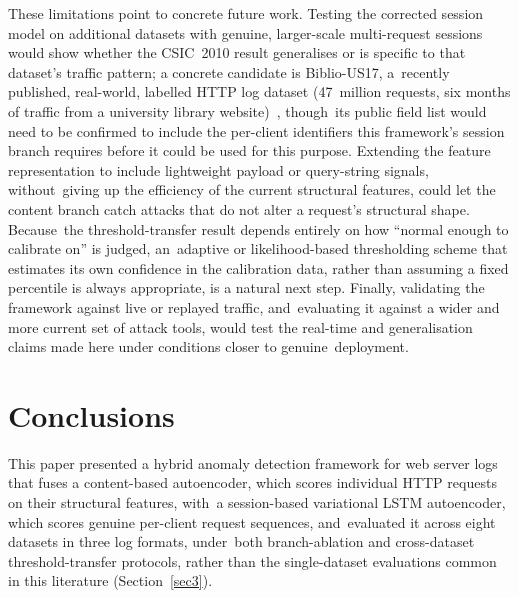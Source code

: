 \documentclass[futureinternet,article,accept,moreauthors]{Definitions/mdpi}
\begin{document}
These limitations point to concrete future work. Testing the corrected session model on additional datasets with genuine, larger-scale multi-request sessions would show whether the CSIC~2010 result generalises or is specific to that dataset's traffic pattern; a concrete candidate is Biblio-US17, a~recently published, real-world, labelled HTTP log dataset (\mbox{47 million} requests, six months of traffic from a university library website)~\cite{diazverdejo2025}, though~its public field list would need to be confirmed to include the per-client identifiers this framework's session branch requires before it could be used for this purpose. Extending the feature representation to include lightweight payload or query-string signals, without~giving up the efficiency of the current structural features, could let the content branch catch attacks that do not alter a request's structural shape. Because~the threshold-transfer result depends entirely on how ``normal enough to calibrate on'' is judged, an~adaptive or likelihood-based thresholding scheme that estimates its own confidence in the calibration data, rather than assuming a fixed percentile is always appropriate, is a natural next step. Finally, validating the framework against live or replayed traffic, and~evaluating it against a wider and more current set of attack tools, would test the real-time and generalisation claims made here under conditions closer to genuine~deployment.

\section{Conclusions} \label{sec7}

This paper presented a hybrid anomaly detection framework for web server logs that fuses a content-based autoencoder, which scores individual HTTP requests on their structural features, with~a session-based variational LSTM autoencoder, which scores genuine per-client request sequences, and~evaluated it across eight datasets in three log formats, under~both branch-ablation and cross-dataset threshold-transfer protocols, rather than the single-dataset evaluations common in this literature (Section~\ref{sec3}).
\end{document}

